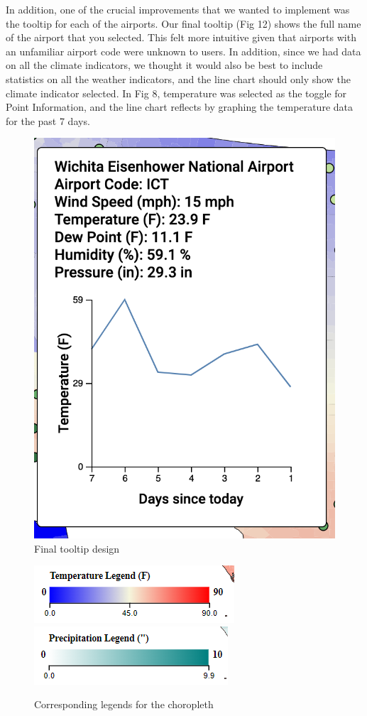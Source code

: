 \documentclass[10pt,twocolumn,twoside]{opticajnl}
\begin{document}
In addition, one of the crucial improvements that we wanted to implement was the tooltip for each of the airports. Our final tooltip (Fig 12) shows the full name of the airport that you selected. This felt more intuitive given that airports with an unfamiliar airport code were unknown to users. In addition, since we had data on all the climate indicators, we thought it would also be best to include statistics on all the weather indicators, and the line chart should only show the climate indicator selected. In Fig 8, temperature was selected as the toggle for Point Information, and the line chart reflects by graphing the temperature data for the past 7 days.

\begin{figure}
    \centering
    \includegraphics[scale=0.5]{images/img9.png}
    \caption{Final tooltip design}
\end{figure}

\begin{figure}
	\centering
	\includegraphics[scale=0.35]{images/legend.png}
	\includegraphics[scale=0.35]{images/legendP.png}
	\caption{Corresponding legends for the choropleth}
\end{figure}
\end{document}
